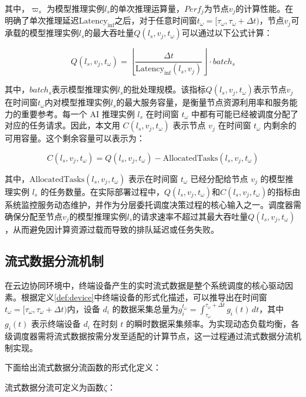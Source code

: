其中，$\varpi_s$ 为模型推理实例$l_s$的单次推理运算量，$Perf_j$为节点$v_j$的计算性能。在明确了单次推理延迟$\text{Latency}_{\text{inf}}$之后，对于任意时间窗$t_\omega = [\tau_\omega, \tau_\omega + \Delta t)$，节点$v_j$可承载的模型推理实例$l_s$的最大吞吐量$Q(l_s, v_j, t_\omega)$可以通过以下公式计算：

\begin{equation}
Q(l_s, v_j, t_\omega) = \left\lfloor \frac{\Delta t}{\text{Latency}_{\text{inf}}(l_s, v_j)} \right\rfloor \cdot batch_s
\end{equation}

其中，$batch_s$表示模型推理实例$l_s$的批处理规模。该指标$Q(l_s, v_j, t_\omega)$表示节点$v_j$在时间窗$t_\omega$内对模型推理实例$l_s$的最大服务容量，是衡量节点资源利用率和服务能力的重要参考。每一个 AI 推理实例 $l_s$ 在时间窗 $t_\omega$ 中都有可能已经被调度分配了对应的任务请求。因此，本文用 $C(l_s, v_j, t_\omega)$ 表示节点 $v_j$ 在时间窗 $t_\omega$ 内剩余的可用容量。这个剩余容量可以表示为：

\begin{equation}
C(l_s, v_j, t_\omega) = Q(l_s, v_j, t_\omega) - \text{AllocatedTasks}(l_s, v_j, t_\omega)
\end{equation}

其中，$\text{AllocatedTasks}(l_s, v_j, t_\omega)$ 表示在时间窗 $t_\omega$ 已经分配给节点 $v_j$ 的模型推理实例 $l_s$ 的任务数量。在实际部署过程中，$Q(l_s, v_j, t_\omega)$和$C(l_s, v_j, t_\omega)$的指标由系统监控服务动态维护，并作为分层委托调度决策过程的核心输入之一。调度器需确保分配至节点$v_j$的模型推理实例$l_s$的请求速率不超过其最大吞吐量$Q(l_s, v_j, t_\omega)$，从而避免因计算资源过载而导致的排队延迟或任务失败。


\subsection{流式数据分流机制}

在云边协同环境中，终端设备产生的实时流式数据是整个系统调度的核心驱动因素。根据定义\ref{def:device}中终端设备的形式化描述，可以推导出在时间窗$t_\omega = [\tau_\omega, \tau_\omega + \Delta t)$内，设备 $d_i$ 的数据采集总量为$g_i^{t_\omega} = \int_{\tau_\omega}^{\tau_\omega + \Delta t} g_i(t) \, dt$，其中$g_i(t)$ 表示终端设备 $d_i$ 在时刻 $t$ 的瞬时数据采集频率。为实现动态负载均衡，各级调度器需将流式数据按需分发至适配的计算节点，这一过程通过流式数据分流机制实现。

下面给出流式数据分流函数的形式化定义：

\begin{definition}[流式数据分流函数]
流式数据分流可定义为函数$\zeta$：
\end{definition}

